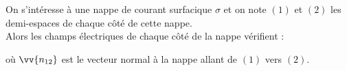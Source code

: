 ﻿\documentclass[a4paper]{article}
\begin{document}
\pagestyle{fancy}
\fancyhf{}
\setlength{\headheight}{15pt}

\begin{center}
	\large{}
\end{center}


On s'intéresse à une nappe de courant surfacique \(\sigma\) et on note \((1)\) et \((2)\) les demi-espaces de chaque côté de cette nappe.\\
Alors les champs électriques de chaque côté de la nappe vérifient :\begin{center}\end{center}
où \(\vv{n_{12}}\) est le vecteur normal à la nappe allant de \((1)\) vers \((2)\).
\end{document}
